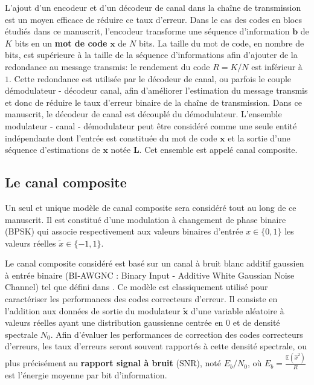 L'ajout d'un encodeur et d'un décodeur de canal dans la chaîne de transmission est un moyen efficace de réduire ce taux d'erreur. Dans le cas des codes en blocs étudiés dans ce manuscrit, l'encodeur transforme une séquence d'information $\mathbold{b}$ de $K$ bits en un \textbf{mot de code} $\mathbold{x}$ de $N$ bits. La taille du mot de code, en nombre de bits, est supérieure à la taille de la séquence d'informations afin d'ajouter de la redondance au message transmis: le rendement du code $R=K/N$ est inférieur à $1$.  Cette redondance est utilisée par le décodeur de canal, ou parfois le couple démodulateur - décodeur canal, afin d'améliorer l'estimation du message transmis et donc de réduire le taux d'erreur binaire de la chaîne de transmission. Dans ce manuscrit, le décodeur de canal est découplé du démodulateur. L'ensemble modulateur - canal - démodulateur peut être considéré comme une seule entité indépendante dont l'entrée est constituée du mot de code $\mathbold{x}$ et la sortie d'une séquence d'estimations de $\mathbold{x}$ notée $\mathbold{L}$. Cet ensemble est appelé canal composite.

\subsection{Le canal composite}
\label{subsec:canal}

Un seul et unique modèle de canal composite sera considéré tout au long de ce manuscrit. Il est constitué d'une modulation à changement de phase binaire (BPSK) qui associe respectivement aux valeurs binaires d'entrée $x\in\{0,1\}$ les valeurs réelles $\tilde{x}\in\{-1,1\}$.

Le canal composite considéré est basé sur un canal à bruit blanc additif gaussien à entrée binaire (BI-AWGNC : Binary Input - Additive White Gaussian Noise Channel) tel que défini dans \cite[section~1.5.1.3]{ryan2009channel}. Ce modèle est classiquement utilisé pour caractériser les performances des codes correcteurs d'erreur. Il consiste en l'addition aux données de sortie du modulateur $\mathbold{\tilde{x}}$ d'une variable aléatoire à valeurs réelles ayant une distribution gaussienne centrée en $0$ et de densité spectrale $N_0$. Afin d'évaluer les performances de correction des codes correcteurs d'erreurs, les taux d'erreurs seront souvent rapportés à cette densité spectrale, ou plus précisément au \textbf{rapport signal à bruit} (SNR), noté $E_b/N_0$, où $E_b=\frac{\mathbb{E}(\hat{x}^2)}{R}$ est l'énergie moyenne par bit d'information.

